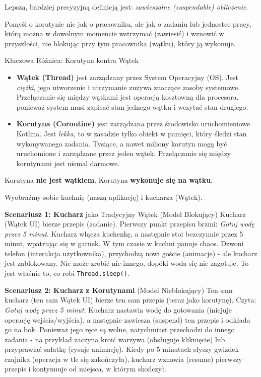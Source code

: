 Lepszą, bardziej precyzyjną definicją jest: \textit{zawieszalne (suspendable) obliczenie}.

Pomyśl o korutynie nie jak o pracowniku, ale jak o zadaniu lub jednostce pracy, którą można w dowolnym momencie wstrzymać (zawiesić) i wznowić w przyszłości, nie blokując przy tym pracownika (wątku), który ją wykonuje.

Kluczowa Różnica: Korutyna kontra Wątek
\begin{itemize}
\item \textbf{Wątek (Thread)} jest zarządzany przez System Operacyjny (OS). Jest \textit{ciężki}, jego utworzenie i utrzymanie zużywa znaczące zasoby systemowe. Przełączanie się między wątkami jest operacją kosztowną dla procesora, ponieważ system musi zapisać stan jednego wątku i wczytać stan drugiego.
\item \textbf{Korutyna (Coroutine)} jest zarządzana przez środowisko uruchomieniowe Kotlina. Jest \textit{lekka}, to w zasadzie tylko obiekt w pamięci, który śledzi stan wykonywanego zadania. Tysiące, a nawet miliony korutyn mogą być uruchomione i zarządzane przez jeden wątek. Przełączanie się między korutynami jest niemal darmowe.
\end{itemize}

Korutyna \textbf{nie jest wątkiem}. Korutyna \textbf{wykonuje się na wątku}.

Wyobraźmy sobie kuchnię (naszą aplikację) i kucharza (Wątek).

\textbf{Scenariusz 1: Kucharz} jako Tradycyjny Wątek (Model Blokujący) Kucharz (Wątek UI) bierze przepis (zadanie). Pierwszy punkt przepisu brzmi: \textit{Gotuj wodę przez 5 minut}. Kucharz włącza kuchenkę, a następnie stoi bezczynnie przez 5 minut, wpatrując się w garnek. W tym czasie w kuchni panuje chaos. Dzwoni telefon (interakcja użytkownika), przychodzą nowi goście (animacje) - ale kucharz jest zablokowany. Nie może zrobić nic innego, dopóki woda się nie zagotuje. To jest właśnie to, co robi \texttt{Thread.sleep()}.

\textbf{Scenariusz 2: Kucharz z Korutynami} (Model Nieblokujący) Ten sam kucharz (ten sam Wątek UI) bierze ten sam przepis (teraz jako korutynę). Czyta: \textit{Gotuj wodę przez 5 minut}. Kucharz nastawia wodę do gotowania (inicjuje operację wejścia/wyjścia), a następnie zawiesza (suspend) ten przepis i odkłada go na bok. Ponieważ jego ręce są wolne, natychmiast przechodzi do innego zadania - na przykład zaczyna kroić warzywa (obsługuje kliknięcie) lub przyprawiać sałatkę (rysuje animację). Kiedy po 5 minutach słyszy gwizdek czajnika (operacja w tle się zakończyła), kucharz wznawia (resume) pierwszy przepis i kontynuuje od miejsca, w którym skończył.

